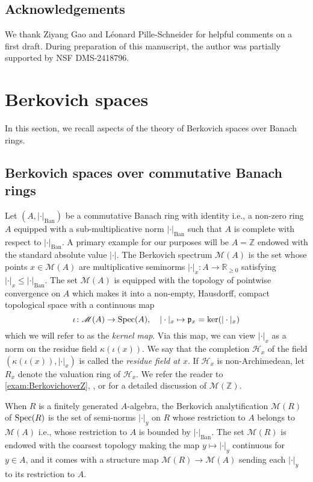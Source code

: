 \documentclass[11pt,reqno]{amsart}
\newcommand{\mZ}{\mathbb{Z}}
\newcommand{\mR}{\mathbb{R}}
\newcommand{\sH}{{\mathscr H}}
\newcommand{\sM}{{\mathscr M}}
\theoremstyle{theorem}
\numberwithin{equation}{subsection}
\numberwithin{equation}{subsection}
\theoremstyle{definition}
\theoremstyle{remark}
\numberwithin{equation}{subsubsection} \numberwithin{figure}{section}
\newcommand{\cdef}[1]{\textsf{\textit{#1}}}
\renewcommand{\leq}{\leqslant}
\renewcommand{\geq}{\geqslant}
\DeclareMathOperator{\Ban}{Ban}
\begin{document}
\subsection*{Acknowledgements}
We thank Ziyang Gao and L\'eonard Pille-Schneider for helpful comments on a first draft.  
During preparation of this manuscript, the author was partially supported by NSF DMS-2418796.  


\section{Berkovich spaces}
\label{sec:Berkovich}
In this section, we recall aspects of the theory of Berkovich spaces over Banach rings. 

\subsection{Berkovich spaces over commutative Banach rings}
Let $(A,|\cdot|_{\Ban})$ be a commutative Banach ring with identity i.e., a non-zero ring $A$ equipped with a sub-multiplicative norm $|\cdot|_{\Ban}$ such that $A$ is complete with respect to $|\cdot|_{\Ban}$. 
A primary example for our purposes will be $A = \mZ$ endowed with the standard absolute value $|\cdot|$. 
The Berkovich spectrum $\sM(A)$ is the set whose points $x\in \sM(A)$ are multiplicative seminorms $|\cdot|_x\colon A \to \mR_{\geq 0}$ satisfying $|\cdot|_x \leq |\cdot|_{\Ban}$. 
The set $\sM(A)$ is equipped with the topology of pointwise convergence on $A$ which makes it into a non-empty, Hausdorff, compact topological space with a continuous map
\begin{equation}\label{eqn:kernelmap}
\iota \colon \sM(A) \to \Spec(A),\quad |\cdot|_x \mapsto \mathfrak{p}_x = \ker(|\cdot|_x)
\end{equation}
which we will refer to as the \cdef{kernel map}. 
Via this map, we can view $|\cdot|_x$ as a norm on the residue field $\kappa(\iota(x))$. 
We say that the completion $\sH_x$ of the field $(\kappa(\iota(x)),|\cdot|_x)$ is called the \cdef{residue field at $x$}. 
If $\sH_x$ is non-Archimedean, let $R_{x}$ denote the valuation ring of $\sH_x$. 
We refer the reader to \autoref{exam:BerkovichoverZ}, \cite[Example 1.4.1]{BerkovichSpectral}, or \cite[Example 1.3]{PilleSchneider:Global} for a detailed discussion of $\sM(\mZ)$. 

When $R$ is a finitely generated $A$-algebra, the Berkovich analytification $\sM(R)$ of $\operatorname{Spec}(R)$ is the set of semi-norms $|\cdot|_y$ on $R$ whose restriction to $A$ belongs to $\sM(A)$ i.e., whose restriction to $A$ is bounded by $|\cdot|_{\Ban}$. The set $\sM(R)$ is endowed with the coarsest topology making the map $y \mapsto |\cdot|_y$ continuous for $y \in A$, and it comes with a structure map $\sM(R) \to \sM(A)$ sending each $|\cdot|_y$ to its restriction to $A$. 
\end{document}
